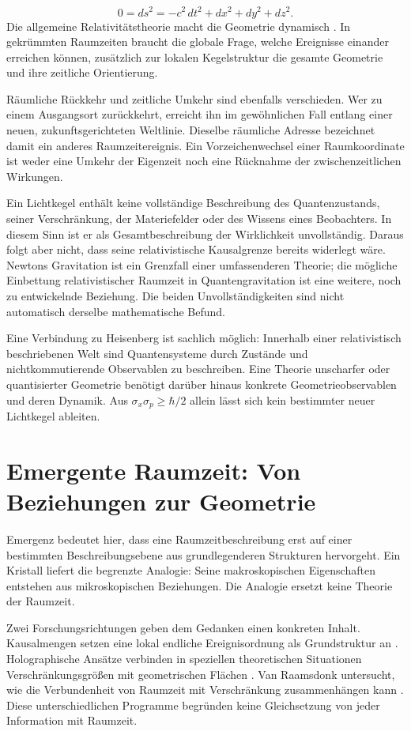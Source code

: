 \begin{equation}\label{de:eq7}
0=ds^2=-c^2\,dt^2+dx^2+dy^2+dz^2.
\end{equation}
Die allgemeine Relativitätstheorie macht die Geometrie dynamisch \cite{1}. In gekrümmten Raumzeiten braucht die globale Frage, welche Ereignisse einander erreichen können, zusätzlich zur lokalen Kegelstruktur die gesamte Geometrie und ihre zeitliche Orientierung.

Räumliche Rückkehr und zeitliche Umkehr sind ebenfalls verschieden. Wer zu einem Ausgangsort zurückkehrt, erreicht ihn im gewöhnlichen Fall entlang einer neuen, zukunftsgerichteten Weltlinie. Dieselbe räumliche Adresse bezeichnet damit ein anderes Raumzeitereignis. Ein Vorzeichenwechsel einer Raumkoordinate ist weder eine Umkehr der Eigenzeit noch eine Rücknahme der zwischenzeitlichen Wirkungen.

Ein Lichtkegel enthält keine vollständige Beschreibung des Quantenzustands, seiner Verschränkung, der Materiefelder oder des Wissens eines Beobachters. In diesem Sinn ist er als Gesamtbeschreibung der Wirklichkeit unvollständig. Daraus folgt aber nicht, dass seine relativistische Kausalgrenze bereits widerlegt wäre. Newtons Gravitation ist ein Grenzfall einer umfassenderen Theorie; die mögliche Einbettung relativistischer Raumzeit in Quantengravitation ist eine weitere, noch zu entwickelnde Beziehung. Die beiden Unvollständigkeiten sind nicht automatisch derselbe mathematische Befund.

Eine Verbindung zu Heisenberg ist sachlich möglich: Innerhalb einer relativistisch beschriebenen Welt sind Quantensysteme durch Zustände und nichtkommutierende Observablen zu beschreiben. Eine Theorie unscharfer oder quantisierter Geometrie benötigt darüber hinaus konkrete Geometrieobservablen und deren Dynamik. Aus \(\sigma_x\sigma_p\geq\hbar/2\) allein lässt sich kein bestimmter neuer Lichtkegel ableiten.

\section{Emergente Raumzeit: Von Beziehungen zur Geometrie}\label{de:sec8}
Emergenz bedeutet hier, dass eine Raumzeitbeschreibung erst auf einer bestimmten Beschreibungsebene aus grundlegenderen Strukturen hervorgeht. Ein Kristall liefert die begrenzte Analogie: Seine makroskopischen Eigenschaften entstehen aus mikroskopischen Beziehungen. Die Analogie ersetzt keine Theorie der Raumzeit.

Zwei Forschungsrichtungen geben dem Gedanken einen konkreten Inhalt. Kausalmengen setzen eine lokal endliche Ereignisordnung als Grundstruktur an \cite{14}. Holographische Ansätze verbinden in speziellen theoretischen Situationen Verschränkungsgrößen mit geometrischen Flächen \cite{12}. Van Raamsdonk untersucht, wie die Verbundenheit von Raumzeit mit Verschränkung zusammenhängen kann \cite{13}. Diese unterschiedlichen Programme begründen keine Gleichsetzung von jeder Information mit Raumzeit.

